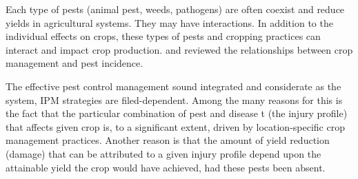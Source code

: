 Each type of pests (animal pest, weeds, pathogens) are  often coexist and reduce yields in agricultural systems. They may have interactions. In addition to the individual effects on crops, these types of pests and cropping practices can interact and impact crop production. \cite{Ou_1985_Rice,Ho_1994_Weed,Cohen_1998_Importance} and \cite{Mew_2004_Looking} reviewed the relationships between crop management and pest incidence. 
 
The effective pest control management sound integrated and considerate as the system, IPM strategies are filed-dependent. Among the many reasons for this is the fact that the particular combination of pest and disease t (the injury profile) that affects given crop is, to a significant extent, driven by location-specific crop management practices. Another reason is that the amount of yield reduction (damage) that can be attributed to a given injury profile depend upon the attainable yield the crop would have achieved, had these pests been absent. 